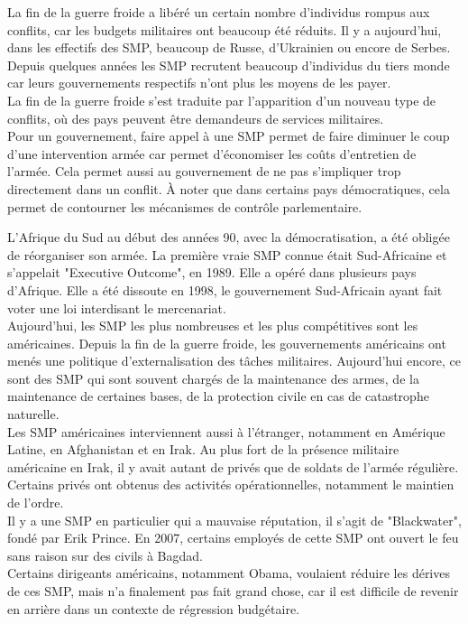 \documentclass[10pt, a4paper, openany]{book}
\begin{document}
La fin de la guerre froide a libéré un certain nombre d'individus rompus aux conflits, car les budgets militaires ont beaucoup été réduits. Il y a aujourd'hui, dans les effectifs des SMP, beaucoup de Russe, d'Ukrainien ou encore de Serbes. \\
Depuis quelques années les SMP recrutent beaucoup d'individus du tiers monde car leurs gouvernements respectifs n'ont plus les moyens de les payer. \\
La fin de la guerre froide s'est traduite par l'apparition d'un nouveau type de conflits, où des pays peuvent être demandeurs de services militaires. \\
Pour un gouvernement, faire appel à une SMP permet de faire diminuer le coup d'une intervention armée car permet d'économiser les coûts d'entretien de l'armée. Cela permet aussi au gouvernement de ne pas s'impliquer trop directement dans un conflit. À noter que dans certains pays démocratiques, cela permet de contourner les mécanismes de contrôle parlementaire. 


L'Afrique du Sud au début des années 90, avec la démocratisation, a été obligée de réorganiser son armée. La première vraie SMP connue était Sud-Africaine et s'appelait "Executive Outcome", en 1989. Elle a opéré dans plusieurs pays d'Afrique. Elle a été dissoute en 1998, le gouvernement Sud-Africain ayant fait voter une loi interdisant le mercenariat. \\
Aujourd'hui, les SMP les plus nombreuses et les plus compétitives sont les américaines. Depuis la fin de la guerre froide, les gouvernements américains ont menés une politique d'externalisation des tâches militaires. Aujourd'hui encore, ce sont des SMP qui sont souvent chargés de la maintenance des armes, de la maintenance de certaines bases, de la protection civile en cas de catastrophe naturelle. \\
Les SMP américaines interviennent aussi à l'étranger, notamment en Amérique Latine, en Afghanistan et en Irak. Au plus fort de la présence militaire américaine en Irak, il y avait autant de privés que de soldats de l'armée régulière. Certains privés ont obtenus des activités opérationnelles, notamment le maintien de l'ordre. \\
Il y a une SMP en particulier qui a mauvaise réputation, il s'agit de "Blackwater", fondé par Erik Prince. En 2007, certains employés de cette SMP ont ouvert le feu sans raison sur des civils à Bagdad. \\
Certains dirigeants américains, notamment Obama, voulaient réduire les dérives de ces SMP, mais n'a finalement pas fait grand chose, car il est difficile de revenir en arrière dans un contexte de régression budgétaire. 
\end{document}
